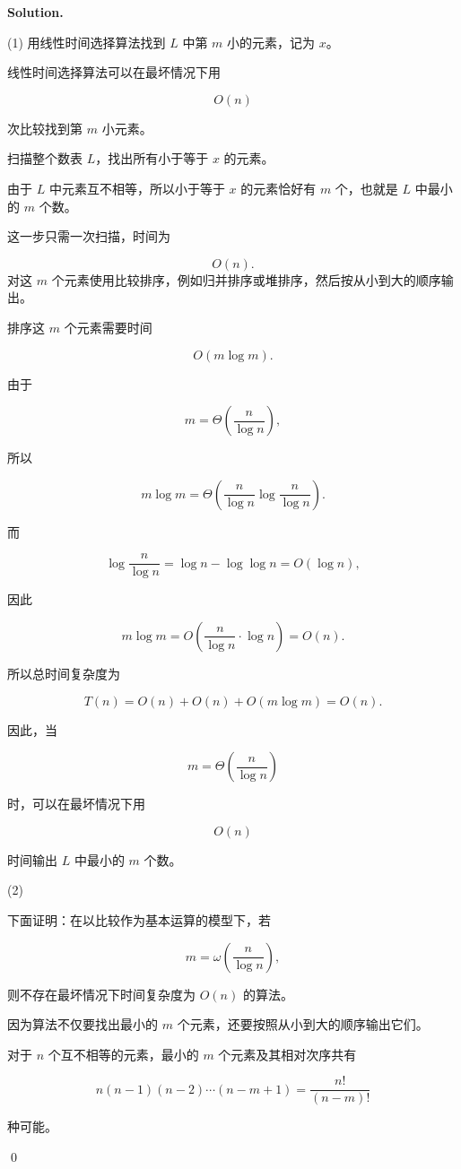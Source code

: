 \documentclass[11pt]{article}
\newenvironment{solution}{
\par\noindent\textbf{Solution.}\par\noindent
}{\qed}
\begin{document}
\begin{solution}
(1) 
用线性时间选择算法找到 $L$ 中第 $m$ 小的元素，记为 $x$。

线性时间选择算法可以在最坏情况下用

\[
O(n)
\]

次比较找到第 $m$ 小元素。

扫描整个数表 $L$，找出所有小于等于 $x$ 的元素。

由于 $L$ 中元素互不相等，所以小于等于 $x$ 的元素恰好有 $m$ 个，也就是 $L$ 中最小的 $m$ 个数。

这一步只需一次扫描，时间为

\[
O(n).
\]
对这 $m$ 个元素使用比较排序，例如归并排序或堆排序，然后按从小到大的顺序输出。

排序这 $m$ 个元素需要时间

\[
O(m\log m).
\]

由于

\[
m=\Theta\left(\frac{n}{\log n}\right),
\]

所以

\[
m\log m
=
\Theta\left(\frac{n}{\log n}\log \frac{n}{\log n}\right).
\]

而

\[
\log \frac{n}{\log n}
=
\log n-\log\log n
=
O(\log n),
\]

因此

\[
m\log m
=
O\left(\frac{n}{\log n}\cdot \log n\right)
=
O(n).
\]

所以总时间复杂度为

\[
T(n)
=
O(n)+O(n)+O(m\log m)
=
O(n).
\]

因此，当

\[
m=\Theta\left(\frac{n}{\log n}\right)
\]

时，可以在最坏情况下用

\[
O(n)
\]

时间输出 $L$ 中最小的 $m$ 个数。

(2) 

下面证明：在以比较作为基本运算的模型下，若

\[
m=\omega\left(\frac{n}{\log n}\right),
\]

则不存在最坏情况下时间复杂度为 $O(n)$ 的算法。

因为算法不仅要找出最小的 $m$ 个元素，还要按照从小到大的顺序输出它们。

对于 $n$ 个互不相等的元素，最小的 $m$ 个元素及其相对次序共有

\[
n(n-1)(n-2)\cdots (n-m+1)
=
\frac{n!}{(n-m)!}
\]

种可能。


\end{solution}
\end{document}
